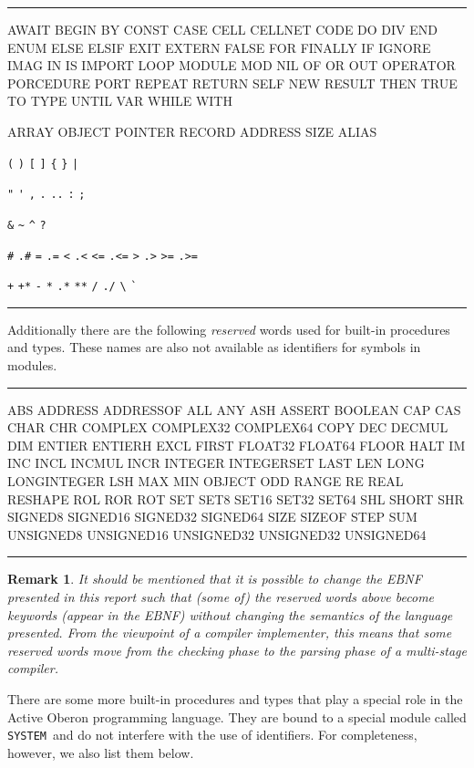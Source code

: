 \documentclass[a4wide,11pt]{article}
\newtheorem{remark}{Remark}
\newcommand{\SYSTEM}{\lstinline"SYSTEM"}
\newcommand{\srcfont}{\usefont{T1}{lmtt}{b}{n}}
\newenvironment{codebox}{%
\par
\begin{minipage}{\linewidth}
\hrule\vspace{0.1cm}
}{
\vspace{0.1cm}
\hrule
\end{minipage}
}
\begin{document}
\begin{codebox}
{\srcfont
AWAIT BEGIN BY CONST CASE CELL CELLNET CODE DO DIV END ENUM ELSE ELSIF EXIT EXTERN FALSE FOR FINALLY IF IGNORE IMAG IN IS IMPORT LOOP MODULE MOD NIL OF OR OUT OPERATOR PORCEDURE PORT REPEAT RETURN SELF NEW RESULT THEN TRUE TO TYPE UNTIL VAR WHILE WITH

ARRAY OBJECT POINTER RECORD ADDRESS SIZE ALIAS
}

\verb~(~ \verb~)~ \verb~[~ \verb~]~ \verb~{~ \verb~}~ \verb~|~

\verb~"~ \verb~'~ \verb~,~ \verb~.~ \verb~..~ \verb~:~ \verb~;~

\verb~&~ \verb.~. \verb~^~  \verb~?~

\verb~#~ \verb~.#~ \verb~=~ \verb~.=~ \verb~<~ \verb~.<~ \verb~<=~ \verb~.<=~ \verb~>~ \verb~.>~ \verb~>=~ \verb~.>=~

\verb~+~ \verb~+*~ \verb~-~ \verb~*~ \verb~.*~ \verb~**~  \verb~/~ \verb~./~ \verb~\~ \verb~`~

\end{codebox}

Additionally there are the following \emph{reserved} words used for built-in procedures and types.
These names are also not available as identifiers for symbols in modules.



\begin{codebox}
\srcfont
ABS
ADDRESS
ADDRESSOF
ALL
ANY
ASH
ASSERT
BOOLEAN
CAP
CAS
CHAR
CHR
COMPLEX
COMPLEX32
COMPLEX64
COPY
DEC
DECMUL
DIM
ENTIER
ENTIERH
EXCL
FIRST
FLOAT32
FLOAT64
FLOOR
HALT
IM
INC
INCL
INCMUL
INCR
INTEGER
INTEGERSET
LAST
LEN
LONG
LONGINTEGER
LSH
MAX
MIN
OBJECT
ODD
RANGE
RE
REAL
RESHAPE
ROL
ROR
ROT
SET
SET8
SET16
SET32
SET64
SHL
SHORT
SHR
SIGNED8
SIGNED16
SIGNED32
SIGNED64
SIZE
SIZEOF
STEP
SUM
UNSIGNED8
UNSIGNED16
UNSIGNED32
UNSIGNED32
UNSIGNED64
\end{codebox}

\begin{remark}
It should be mentioned that it is possible to change the EBNF presented in this report such that (some of) the reserved words above become keywords (appear in the EBNF) without changing the semantics of the language presented.
From the viewpoint of a compiler implementer, this means that some reserved words move from the checking phase to the parsing phase of a multi-stage compiler.
\end{remark}


There are some more built-in procedures and types that play a special role in the Active Oberon programming language.
They are bound to a special module called \SYSTEM\ and do not interfere with the use of identifiers.
For completeness, however, we also list them below.
\end{document}
